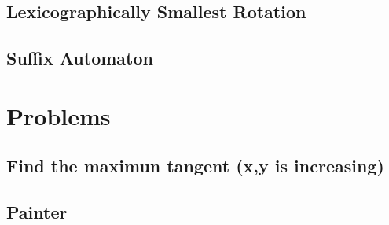 \documentclass[10pt,twocolumn,oneside]{article}
\begin{document}
\subsection{Lexicographically Smallest Rotation}


\subsection{Suffix Automaton}


\section{Problems}
%

\subsection{Find the maximun tangent (x,y is increasing)}


%

%

\subsection{Painter}


%
\end{document}
